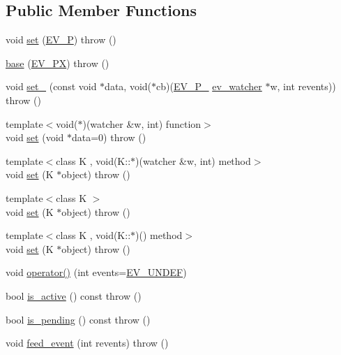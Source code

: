 \subsection*{\-Public \-Member \-Functions}
\begin{DoxyCompactItemize}
\item 
void \hyperlink{structev_1_1base_ad02b7a6404f526c66ff2fba57579c9e5}{set} (\hyperlink{ev_8h_a6e6c6b499d18513c01cf4bde00121617}{\-E\-V\-\_\-\-P})  throw ()
\item 
\hyperlink{structev_1_1base_a773ad44efc538a04b3438ffad4a74bce}{base} (\hyperlink{structev_1_1base_a10f8def21e238e568c7bd2541aaae780}{\-E\-V\-\_\-\-P\-X})  throw ()
\item 
void \hyperlink{structev_1_1base_aec931fdffea513b4bff15b262dc0437d}{set\-\_\-} (const void $\ast$data, void($\ast$cb)(\hyperlink{ev_8h_a8ac42969e0a499b8c1367f0ad85dbba9}{\-E\-V\-\_\-\-P\-\_\-} \hyperlink{structev__watcher}{ev\-\_\-watcher} $\ast$w, int revents))  throw ()
\item 
{\footnotesize template$<$void($\ast$)(watcher \&w, int) function$>$ }\\void \hyperlink{structev_1_1base_affb794c41e2b56a976d5ecb7e78650a1}{set} (void $\ast$data=0)  throw ()
\item 
{\footnotesize template$<$class K , void(\-K\-::$\ast$)(watcher \&w, int) method$>$ }\\void \hyperlink{structev_1_1base_aad05c184ef537a75dc9f6863dc003dc7}{set} (\-K $\ast$object)  throw ()
\item 
{\footnotesize template$<$class K $>$ }\\void \hyperlink{structev_1_1base_a212d1dd3c68d3f8f3603b42e554db534}{set} (\-K $\ast$object)  throw ()
\item 
{\footnotesize template$<$class K , void(\-K\-::$\ast$)() method$>$ }\\void \hyperlink{structev_1_1base_aad05c184ef537a75dc9f6863dc003dc7}{set} (\-K $\ast$object)  throw ()
\item 
void \hyperlink{structev_1_1base_a698363269906e0658cab14ae31d959b5}{operator()} (int events=\hyperlink{ev_8h_abc6126af1d45847bc59afa0aa3216b04ad1171dcfff57cf1425e53bd38d69999d}{\-E\-V\-\_\-\-U\-N\-D\-E\-F})
\item 
bool \hyperlink{structev_1_1base_a1c6aa4f12f0decd6ae4e88b9ea361126}{is\-\_\-active} () const   throw ()
\item 
bool \hyperlink{structev_1_1base_a48b8b232d7917e357ffb0f1137ef9c38}{is\-\_\-pending} () const   throw ()
\item 
void \hyperlink{structev_1_1base_a19cf5d1f44332b12eaaf465b110b91b0}{feed\-\_\-event} (int revents)  throw ()
\end{DoxyCompactItemize}
